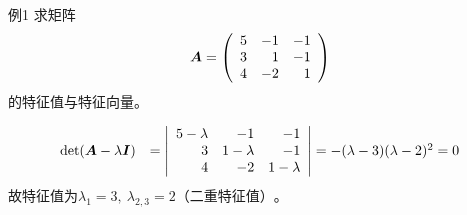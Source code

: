 \begin{frame}
  
  \begin{li}{例1}
    求矩阵
    $$
    \boldsymbol{A}=\left(
      \begin{array}{rrr}
        5&-1&-1\\
        3&1&-1\\
        4&-2&1
      \end{array}
    \right)
    $$
    的特征值与特征向量。
  \end{li}
  \pause
  $$
  \begin{array}{rl}
    \mathrm{det}(\boldsymbol{A}-\lambda\boldsymbol{I})&=\left|\begin{array}{rrr}
                                  5-\lambda&-1&-1\\
                                  3&1-\lambda&-1\\
                                  4&-2&1-\lambda
                                \end{array}\right| =-(\lambda-3)(\lambda-2)^2=0
  \end{array}
  $$
  故特征值为$\lambda_1=3,~\lambda_{2,3}=2\mbox{（二重特征值）}$。
  
\end{frame}

